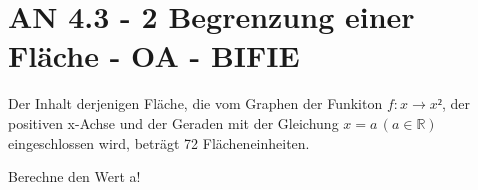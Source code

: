 \section{AN 4.3 - 2 Begrenzung einer Fläche - OA - BIFIE}

\begin{beispiel}[AN 4.3]{1} %
				Der Inhalt derjenigen Fläche, die vom Graphen der Funkiton $f:x\rightarrow x²$, der positiven x-Achse und der Geraden mit der Gleichung $x=a\,(a\in\mathbb{R})$ eingeschlossen wird, beträgt 72 Flächeneinheiten.
				
				Berechne den Wert a!
				\leer
				
\end{beispiel}